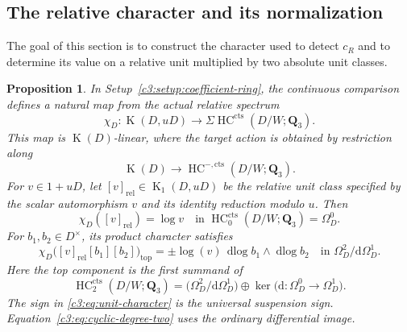 \documentclass[11pt,a4paper]{amsart}
\numberwithin{equation}{section}
\newtheorem{proposition}[theorem]{Proposition}
\theoremstyle{definition}
\theoremstyle{remark}
\newcommand{\CthreeQ}{\mathbf{Q}}
\newcommand{\Cthreedd}{\mathrm{d}}
\newcommand{\Cthreects}{\mathrm{cts}}
\newcommand{\Cthreerel}{\mathrm{rel}}
\newcommand{\Cthreetopcomp}{\mathrm{top}}
\DeclareMathOperator{\CthreeK}{K}
\DeclareMathOperator{\CthreeHC}{HC}
\DeclareMathOperator{\Cthreedlog}{dlog}
\begin{document}
\subsection{The relative character and its normalization}
\label{c3:sec:character}

The goal of this section is to construct the character used to detect
$c_R$ and to determine its value on a relative unit multiplied by two
absolute unit classes.

\begin{proposition}
\label{c3:prop:relative-character}
In Setup~\ref{c3:setup:coefficient-ring}, the continuous comparison defines
a natural map from the actual relative spectrum
\[
 \chi_D\colon
 \CthreeK(D,uD)\longrightarrow
 \Sigma\CthreeHC^\Cthreects(D/W;\CthreeQ_3).
\]
This map is $\CthreeK(D)$-linear, where the target action is obtained by
restriction along
\[
 \CthreeK(D)\longrightarrow\CthreeHC^{-,\Cthreects}(D/W;\CthreeQ_3).
\]
For $v\in1+uD$, let $[v]_{\Cthreerel}\in\CthreeK_1(D,uD)$ be the relative unit
class specified by the scalar automorphism $v$ and its identity
reduction modulo $u$. Then
\[
 \chi_D([v]_{\Cthreerel})=\log v
 \quad\text{in }\CthreeHC^\Cthreects_0(D/W;\CthreeQ_3)=\Omega_D^0.
\]
For $b_1,b_2\in D^\times$, its product character satisfies
\begin{equation}\label{c3:eq:unit-character}
 \chi_D\bigl([v]_{\Cthreerel}[b_1][b_2]\bigr)_{\Cthreetopcomp}
   =\pm\log(v)\,\Cthreedlog b_1\wedge\Cthreedlog b_2
   \quad\text{in }\Omega_D^2/\Cthreedd\Omega_D^1.
\end{equation}
Here the top component is the first summand of
\begin{equation}\label{c3:eq:cyclic-degree-two}
 \CthreeHC^\Cthreects_2(D/W;\CthreeQ_3)
   =
   \bigl(\Omega_D^2/\Cthreedd\Omega_D^1\bigr)
   \oplus
   \ker\bigl(\Cthreedd\colon\Omega_D^0\longrightarrow\Omega_D^1\bigr).
\end{equation}
The sign in \eqref{c3:eq:unit-character} is the universal suspension sign.
Equation~\eqref{c3:eq:cyclic-degree-two} uses the ordinary differential image.
\end{proposition}
\end{document}
